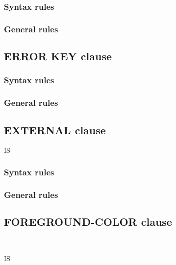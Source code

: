 \subsubsection{Syntax rules}

\subsubsection{General rules}

\subsection{ERROR KEY clause}

\begin{syntax}[\deletedcolour]
\end{syntax}

\subsubsection{Syntax rules}

\subsubsection{General rules}

\subsection{EXTERNAL clause}

\begin{syntax}
  IS 
  \begin{0-1}
     \literal
  \end{0-1}
\end{syntax}

\subsubsection{Syntax rules}

\subsubsection{General rules}

\subsection{FOREGROUND-COLOR clause}

\begin{syntax}
  \begin{1=}
     \\
  \end{1=}
  IS
  \begin{1=}
    \identifier \\
    \literal
  \end{1=}
\end{syntax}

